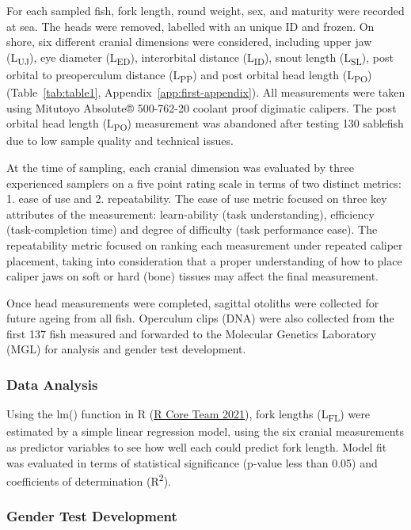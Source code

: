 \documentclass[12pt]{article}\usepackage[]{graphicx}\usepackage[]{color}
\begin{document}
For each sampled fish, fork length, round weight, sex, and maturity were recorded at sea. The heads were removed, labelled with an unique ID and frozen. On shore, six different cranial dimensions were considered, including upper jaw (L\textsubscript{UJ}), eye diameter (L\textsubscript{ED}), interorbital distance (L\textsubscript{ID}), snout length (L\textsubscript{SL}), post orbital to preoperculum distance (L\textsubscript{PP}) and post orbital head length (L\textsubscript{PO}) (Table~\ref{tab:table1}, Appendix~\ref{app:first-appendix}). All measurements were taken using Mitutoyo Absolute® 500-762-20 coolant proof digimatic calipers. The post orbital head length (L\textsubscript{PO}) measurement was abandoned after testing 130 sablefish due to low sample quality and technical issues.

At the time of sampling, each cranial dimension was evaluated by three experienced samplers on a five point rating scale in terms of two distinct metrics: 1. ease of use and 2. repeatability. The ease of use metric focused on three key attributes of the measurement: learn-ability (task understanding), efficiency (task-completion time) and degree of difficulty (task performance ease). The repeatability metric focused on ranking each measurement under repeated caliper placement, taking into consideration that a proper understanding of how to place caliper jaws on soft or hard (bone) tissues may affect the final measurement.

Once head measurements were completed, sagittal otoliths were collected for future ageing from all fish. Operculum clips (DNA) were also collected from the first 137 fish measured and forwarded to the Molecular Genetics Laboratory (MGL) for analysis and gender test development.

\hypertarget{data-analysis}{%
\subsubsection{Data Analysis}\label{data-analysis}}

Using the lm() function in R (\protect\hyperlink{ref-R}{R Core Team 2021}), fork lengths (L\textsubscript{FL}) were estimated by a simple linear regression model, using the six cranial measurements as predictor variables to see how well each could predict fork length. Model fit was evaluated in terms of statistical significance (p-value less than 0.05) and coefficients of determination (R\textsuperscript{2}).

\hypertarget{gender-test-development}{%
\subsubsection{Gender Test Development}\label{gender-test-development}}
\end{document}

